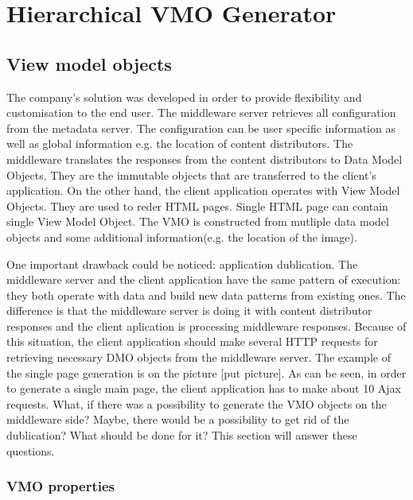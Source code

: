 \section{Hierarchical VMO Generator}

\subsection{View model objects}

The company's solution was developed in order to provide flexibility and customisation to the end user. The middleware server retrieves all configuration from the metadata server. The configuration can be user specific information as well as global information e.g. the location of content distributors. The middleware translates the responses from the content distributors to Data Model Objects. They are the immutable objects that are transferred to the client's application. On the other hand, the client application operates with View Model Objects. They are used to reder HTML pages. Single HTML page can contain single View Model Object. The VMO is constructed from mutliple data model objects and some additional information(e.g. the location of the image).   

One important drawback could be noticed: application dublication. The middleware server and the client application have the same pattern of execution: they both operate with data and build new data patterns from existing ones. The difference is that the middleware server is doing it with content distributor responses and the client aplication is processing middleware responses. Because of this situation, the client application should make several HTTP requests for retrieving necessary DMO objects from the middleware server.  The example of the single page generation is on the picture [put picture]. As can be seen, in order to generate a single main page, the client application has to make about 10 Ajax requests. What, if there was a possibility to generate the VMO objects on the middleware side?  Maybe, there would be a possibility to get rid of the dublication? What should be done for it? This section will answer these questions.

\subsubsection{VMO properties}


